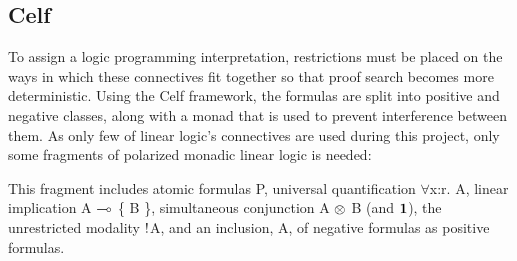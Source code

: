 \subsection{Celf}
\label{LL_02}

To assign a logic programming interpretation, restrictions must be placed on the ways in which these connectives fit together so that proof search becomes more deterministic. Using the Celf  framework, the formulas are split into positive and negative classes, along with a monad that is used to prevent interference between them. As only few of linear logic’s connectives are used during this project, only some fragments of polarized monadic linear logic is needed:


This fragment includes atomic formulas P\super{-}, universal quantification $\forall$x:r. A\super{-}, linear implication A\super{+} $\multimap$ \{ B\super{+} \}, simultaneous conjunction A\super{+} $\otimes$ B\super{+} (and $\mathord{\text{\rm\bf 1}}$), the unrestricted modality $\mathord{\text{\rm !}}$A\super{-}, and an inclusion, A\super{-}, of negative formulas as positive formulas.


\pagebreak
